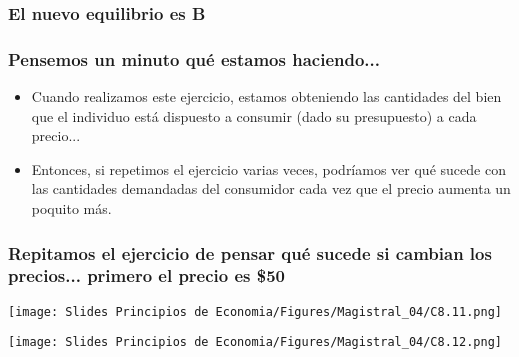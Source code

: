 \documentclass{beamer}
\begin{document}
\begin{frame}
\frametitle{El nuevo equilibrio es B}
\begin{center}
\begin{figure}[H]
\renewcommand{\figurename}{Figure}
\begin{center}
\end{center}
\end{figure}
\end{center}
\end{frame}

\begin{frame}
\frametitle{Pensemos un minuto qué estamos haciendo...}
\begin{itemize}
    \item Cuando realizamos este ejercicio, estamos obteniendo las cantidades del bien que el individuo está dispuesto a consumir (dado su presupuesto) a cada precio... \vspace{2mm}
    \item Entonces, si repetimos el ejercicio varias veces, podríamos ver qué sucede con las cantidades demandadas del consumidor cada vez que el precio aumenta un poquito más.
\end{itemize}
\end{frame}

\begin{frame}
\frametitle{Repitamos el ejercicio de pensar qué sucede si cambian los precios... primero el precio es \$50}
\begin{center}
  \begin{minipage}{0.48\textwidth}
      \texttt{[image: Slides Principios de Economia/Figures/Magistral\_04/C8.11.png]}
  \end{minipage}\hfill
  \begin{minipage}{0.48\textwidth}
      \texttt{[image: Slides Principios de Economia/Figures/Magistral\_04/C8.12.png]}
  \end{minipage}
\end{center}
\end{frame}
\end{document}
